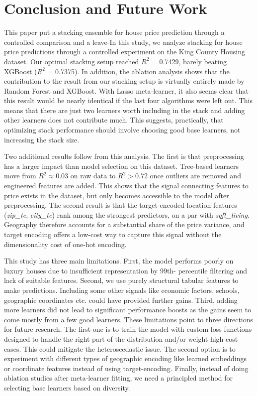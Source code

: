\documentclass[conference]{IEEEtran}
\begin{document}
\section{Conclusion and Future Work}
This paper put a stacking ensemble for house price prediction through a controlled comparison and a leave-In this study, we analyze stacking for house price predictions through a controlled experiment on the King County Housing dataset. Our optimal stacking setup reached $R^{2}$ = 0.7429, barely beating XGBoost ($R^{2}$ = 0.7375). In addition, the ablation analysis shows that the contribution to the result from our stacking setup is virtually entirely made by Random Forest and XGBoost. With Lasso meta-learner, it also seems clear that this result would be nearly identical if the last four algorithms were left out. This means that there are just two learners worth including in the stack and adding other learners does not contribute much. This suggests, practically, that optimizing stack performance should involve choosing good base learners, not increasing the stack size.

Two additional results follow from this analysis. The first is that preprocessing has a larger impact than model selection on this dataset. Tree-based learners move from $R^{2}\approx 0.03$ on raw data to $R^{2}>0.72$ once outliers are removed and engineered features are added. This shows that the signal connecting features to price exists in the dataset, but only becomes accessible to the model after preprocessing. The second result is that the target-encoded location features (\textit{zip\_te}, \textit{city\_te}) rank among the strongest predictors, on a par with \textit{sqft\_living}. Geography therefore accounts for a substantial share of the price variance, and target encoding offers a low-cost way to capture this signal without the dimensionality cost of one-hot encoding.

This study has three main limitations. First, the model performs poorly on luxury houses due to insufficient representation by 99th- percentile filtering and lack of suitable features. Second, we use purely structural tabular features to make predictions. Including some other signals like economic factors, schools, geographic coordinates etc. could have provided further gains. Third, adding more learners did not lead to significant performance boosts as the gains seem to come mostly from a few good learners. These limitations point to three directions for future research. The first one is to train the model with custom loss functions designed to handle the right part of the distribution and/or weight high-cost cases. This could mitigate the heteroscedastic issue\cite{hjort2022house}. The second option is to experiment with different types of geographic encoding like learned embeddings or coordinate features instead of using target-encoding. Finally, instead of doing ablation studies after meta-learner fitting, we need a principled method for selecting base learners based on diversity.
\end{document}
